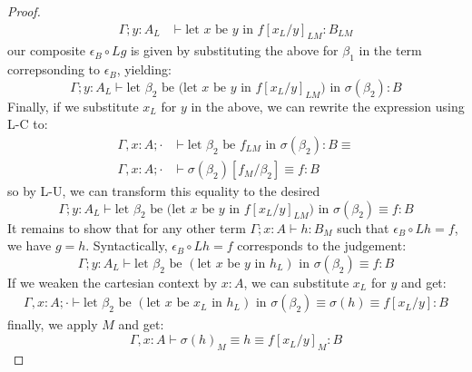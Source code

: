 \begin{thm}[$L \dashv M$]
\begin{proof}
\[
  \begin{split}
    \Gamma; y : A_L &\vdash \text{let $x$ be $y$ in } f[x_L/y]_{LM} : B_{LM}
  \end{split}
\]
our composite $\epsilon_B \circ Lg$ is given by substituting the above for $\beta_1$ in the term correpsonding to $\epsilon_B$, yielding:
\[
  \Gamma; y : A_L \vdash \text{let $\beta_2$ be (let $x$ be $y$ in $f[x_L/y]_{LM}$) in }\sigma(\beta_2) : B
\]
Finally, if we substitute $x_L$ for $y$ in the above, we can rewrite the expression using L-C to:
\[
  \begin{split}
    \Gamma, x : A; \cdot &\vdash \text{let $\beta_2$ be $f_{LM}$ in }\sigma(\beta_2) : B \equiv \\
    \Gamma, x : A; \cdot &\vdash \sigma(\beta_2)[f_M / \beta_2] \equiv f : B
  \end{split}
\]
so by L-U, we can transform this equality to the desired
\[
\Gamma; y : A_L \vdash \text{let $\beta_2$ be (let $x$ be $y$ in $f[x_L/y]_{LM}$) in }\sigma(\beta_2) \equiv f : B
\]
  It remains to show that for any other term $\Gamma; x : A \vdash h : B_M$ such that $\epsilon_B \circ Lh = f$, we have $g = h$. Syntactically, $\epsilon_B \circ Lh = f$  corresponds to the judgement:
  \[
    \Gamma; y : A_L \vdash \text{let $\beta_2$ be $(\text{let $x$ be $y$ in $h_L$})$ in }\sigma(\beta_2) \equiv f : B
  \]
  If we weaken the cartesian context by $x : A$, we can substitute $x_L$ for $y$ and get:
  \[
    \begin{split}
      \Gamma, x : A; \cdot \vdash \text{let $\beta_2$ be $(\text{let $x$ be $x_L$ in $h_L$})$ in }\sigma(\beta_2) \equiv \sigma(h) \equiv f[x_L/y] : B
    \end{split}
    \]
    finally, we apply $M$ and get:
    \[
      \Gamma, x : A \vdash \sigma(h)_M \equiv h \equiv f[x_L/y]_M : B
    \]
\end{proof}
\end{thm}
